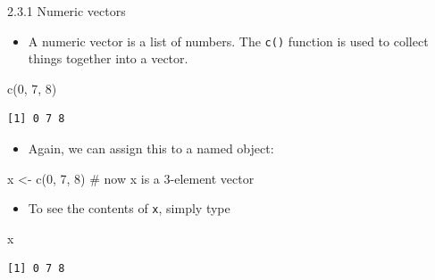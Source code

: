 \documentclass[
  9pt,
  a4paper,
  ignorenonframetext,
  notheorems]{beamer}
\newenvironment{Shaded}{\begin{snugshade}}{\end{snugshade}}
\newcommand{\CommentTok}[1]{\textcolor[rgb]{0.37,0.37,0.37}{#1}}
\newcommand{\DecValTok}[1]{\textcolor[rgb]{0.68,0.00,0.00}{#1}}
\newcommand{\FunctionTok}[1]{\textcolor[rgb]{0.28,0.35,0.67}{#1}}
\newcommand{\NormalTok}[1]{\textcolor[rgb]{0.00,0.23,0.31}{#1}}
\newcommand{\OtherTok}[1]{\textcolor[rgb]{0.00,0.23,0.31}{#1}}
\providecommand{\tightlist}{%
  \setlength{\itemsep}{0pt}\setlength{\parskip}{0pt}}\usepackage{longtable,booktabs,array}
\begin{document}
\begin{frame}[fragile]{2.3.1 Numeric vectors}
\protect\hypertarget{numeric-vectors}{}
\begin{itemize}
\tightlist
\item
  A numeric vector is a list of numbers. The \texttt{c()} function is
  used to collect things together into a vector.
\end{itemize}

\begin{Shaded}
\begin{Highlighting}[]
\FunctionTok{c}\NormalTok{(}\DecValTok{0}\NormalTok{, }\DecValTok{7}\NormalTok{, }\DecValTok{8}\NormalTok{)}
\end{Highlighting}
\end{Shaded}

\begin{verbatim}
[1] 0 7 8
\end{verbatim}

\begin{itemize}
\tightlist
\item
  Again, we can assign this to a named object:
\end{itemize}

\begin{Shaded}
\begin{Highlighting}[]
\NormalTok{x }\OtherTok{\textless{}{-}} \FunctionTok{c}\NormalTok{(}\DecValTok{0}\NormalTok{, }\DecValTok{7}\NormalTok{, }\DecValTok{8}\NormalTok{) }\CommentTok{\# now x is a 3{-}element vector}
\end{Highlighting}
\end{Shaded}

\begin{itemize}
\tightlist
\item
  To see the contents of \texttt{x}, simply type
\end{itemize}

\begin{Shaded}
\begin{Highlighting}[]
\NormalTok{x}
\end{Highlighting}
\end{Shaded}

\begin{verbatim}
[1] 0 7 8
\end{verbatim}
\end{frame}
\end{document}
